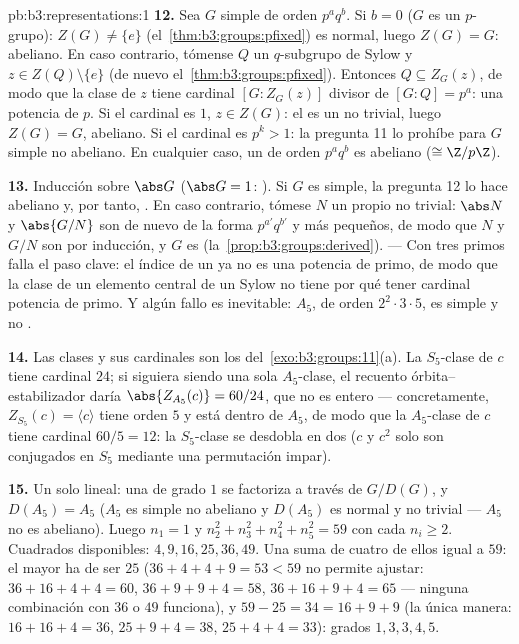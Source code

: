 \begin{solution}{pb:b3:representations:1}
\textbf{12.} Sea $G$ simple de orden $p^aq^b$. Si $b = 0$ ($G$ es un
$p$-grupo): $Z(G) \neq \{e\}$ (el~\cref{thm:b3:groups:pfixed}) es
normal, luego $Z(G) = G$: abeliano. En caso contrario, tómense $Q$ un
$q$-subgrupo de Sylow y $z \in Z(Q)
\setminus\{e\}$ (de nuevo el~\cref{thm:b3:groups:pfixed}). Entonces $Q
\subseteq Z_G(z)$, de modo que la clase de $z$ tiene cardinal
$[G : Z_G(z)]$ divisor de $[G : Q] = p^a$: una potencia de $p$. Si el
cardinal es $1$, $z \in Z(G)$: el 
es un  no trivial, luego
$Z(G) = G$, abeliano. Si el cardinal es $p^k > 1$: la pregunta 11 lo
prohíbe para $G$ simple no abeliano. En cualquier caso, un
 de orden $p^aq^b$ es
abeliano ($\cong \Z/p\Z$).

\textbf{13.} Inducción sobre $\abs G$ ($\abs G = 1$:
). Si $G$ es simple, la
pregunta 12 lo hace abeliano y, por tanto,
. En caso contrario, tómese $N$
un  propio no trivial:
$\abs
N$ y $\abs{G/N}$ son de nuevo de la forma $p^{a'}q^{b'}$ y más pequeños,
de modo que $N$ y $G/N$ son 
por inducción, y $G$ es 
(la~\cref{prop:b3:groups:derived}). --- Con tres primos falla el paso
clave: el índice de un 
ya no es una potencia de primo, de modo que la clase de un elemento
central de un Sylow no tiene por qué tener cardinal potencia de primo. Y
algún fallo es inevitable: $A_5$, de orden $2^2\cdot3\cdot5$, es simple
y no .

\textbf{14.} Las clases y sus cardinales son los
del~\cref{exo:b3:groups:11}(a). La $S_5$-clase de $c$ tiene cardinal
$24$; si siguiera siendo una sola $A_5$-clase, el recuento
órbita--estabilizador daría $\abs{Z_{A_5}(c)} = 60/24$, que no es entero
--- concretamente, $Z_{S_5}(c) = \langle c\rangle$ tiene orden $5$ y
está dentro de $A_5$, de modo que la $A_5$-clase de $c$ tiene cardinal
$60/5 =
12$: la $S_5$-clase se desdobla en dos ($c$ y $c^2$ solo son conjugados
en $S_5$ mediante una permutación impar).

\textbf{15.} Un solo 
lineal: una  de grado
$1$ se factoriza a través de $G/D(G)$, y $D(A_5) = A_5$ ($A_5$ es simple
no abeliano y $D(A_5)$ es normal y no trivial --- $A_5$ no es abeliano).
Luego $n_1 = 1$ y $n_2^2 + n_3^2 + n_4^2
+ n_5^2 = 59$ con cada $n_i \geq 2$. Cuadrados disponibles: $4, 9,
16, 25, 36, 49$. Una suma de cuatro de ellos igual a $59$: el mayor ha
de ser $25$ ($36 + 4 + 4 + 9 = 53 < 59$ no permite ajustar:
$36 + 16 + 4 + 4 = 60$, $36 + 9 + 9 + 4 = 58$, $36 +
16 + 9 + 4 = 65$ --- ninguna combinación con $36$ o $49$ funciona), y
$59 - 25 = 34 = 16 + 9 + 9$ (la única manera: $16 + 16 + 4 =
36$, $25 + 9 + 4 = 38$, $25 + 4 + 4 = 33$): grados $1, 3, 3,
4, 5$.


\end{solution}
